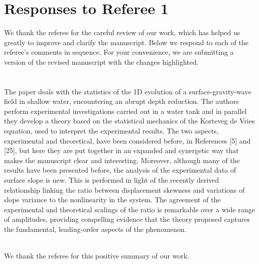 \documentclass[11pt]{article}
\newcommand{\comment}[1]{{\color{blue} #1}}
\begin{document}
\section*{Responses to Referee 1}

We thank the referee for the careful review of our work, which has helped us greatly to improve and clarify the manuscript. Below we respond to each of the referee's comments in sequence. For your convenience, we are submitting a version of the revised manuscript with the changes highlighted. \\ \\ \\


\noindent
\comment{The paper deals with the statistics of the 1D evolution of a surface-gravity-wave field in shallow water, encountering an abrupt depth reduction. The authors perform experimental investigations carried out in a water tank and in parallel they develop a theory based on the statistical mechanics of the Korteveg de Vries equation, used to interpret the experimental results. The two aspects, experimental and theoretical, have been considered before, in References [5] and [25], but here they are put together in an expanded and synergetic way that makes the manuscript clear and interesting. Moreover, although many of the results have been presented before, the analysis of the experimental data of surface slope is new. This is performed in light of the recently derived relationship linking the ratio between displacement skewness and variations of slope variance to the nonlinearity in the system. The agreement of the experimental and theoretical scalings of the ratio is remarkable over a wide range of amplitudes, providing compelling evidence that the theory proposed captures the fundamental, leading-order aspects of the phenomenon.
}

\noindent
\\We thank the referee for this positive summary of our work. \\ \\
\end{document}
